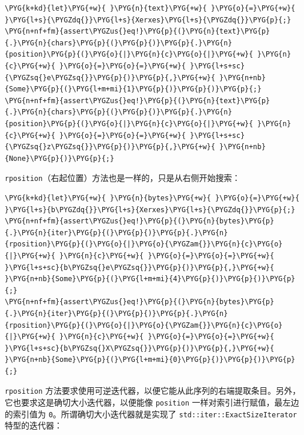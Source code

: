 \begin{Verbatim}[commandchars=\\\{\},breaklines=true,breakanywhere=true,fontsize=\codefont,xleftmargin=17bp]
\PYG{k+kd}{let}\PYG{+w}{ }\PYG{n}{text}\PYG{+w}{ }\PYG{o}{=}\PYG{+w}{ }\PYG{l+s}{\PYGZdq{}}\PYG{l+s}{Xerxes}\PYG{l+s}{\PYGZdq{}}\PYG{p}{;}
\PYG{n+nf+fm}{assert\PYGZus{}eq!}\PYG{p}{(}\PYG{n}{text}\PYG{p}{.}\PYG{n}{chars}\PYG{p}{(}\PYG{p}{)}\PYG{p}{.}\PYG{n}{position}\PYG{p}{(}\PYG{o}{|}\PYG{n}{c}\PYG{o}{|}\PYG{+w}{ }\PYG{n}{c}\PYG{+w}{ }\PYG{o}{=}\PYG{o}{=}\PYG{+w}{ }\PYG{l+s+sc}{\PYGZsq{}e\PYGZsq{}}\PYG{p}{)}\PYG{p}{,}\PYG{+w}{ }\PYG{n+nb}{Some}\PYG{p}{(}\PYG{l+m+mi}{1}\PYG{p}{)}\PYG{p}{)}\PYG{p}{;}
\PYG{n+nf+fm}{assert\PYGZus{}eq!}\PYG{p}{(}\PYG{n}{text}\PYG{p}{.}\PYG{n}{chars}\PYG{p}{(}\PYG{p}{)}\PYG{p}{.}\PYG{n}{position}\PYG{p}{(}\PYG{o}{|}\PYG{n}{c}\PYG{o}{|}\PYG{+w}{ }\PYG{n}{c}\PYG{+w}{ }\PYG{o}{=}\PYG{o}{=}\PYG{+w}{ }\PYG{l+s+sc}{\PYGZsq{}z\PYGZsq{}}\PYG{p}{)}\PYG{p}{,}\PYG{+w}{ }\PYG{n+nb}{None}\PYG{p}{)}\PYG{p}{;}
\end{Verbatim}

\texttt{rposition}（右起位置）方法也是一样的，只是从右侧开始搜索：

\begin{Verbatim}[commandchars=\\\{\},breaklines=true,breakanywhere=true,fontsize=\codefont,xleftmargin=17bp]
\PYG{k+kd}{let}\PYG{+w}{ }\PYG{n}{bytes}\PYG{+w}{ }\PYG{o}{=}\PYG{+w}{ }\PYG{l+s}{b\PYGZdq{}}\PYG{l+s}{Xerxes}\PYG{l+s}{\PYGZdq{}}\PYG{p}{;}
\PYG{n+nf+fm}{assert\PYGZus{}eq!}\PYG{p}{(}\PYG{n}{bytes}\PYG{p}{.}\PYG{n}{iter}\PYG{p}{(}\PYG{p}{)}\PYG{p}{.}\PYG{n}{rposition}\PYG{p}{(}\PYG{o}{|}\PYG{o}{\PYGZam{}}\PYG{n}{c}\PYG{o}{|}\PYG{+w}{ }\PYG{n}{c}\PYG{+w}{ }\PYG{o}{=}\PYG{o}{=}\PYG{+w}{ }\PYG{l+s+sc}{b\PYGZsq{}e\PYGZsq{}}\PYG{p}{)}\PYG{p}{,}\PYG{+w}{ }\PYG{n+nb}{Some}\PYG{p}{(}\PYG{l+m+mi}{4}\PYG{p}{)}\PYG{p}{)}\PYG{p}{;}
\PYG{n+nf+fm}{assert\PYGZus{}eq!}\PYG{p}{(}\PYG{n}{bytes}\PYG{p}{.}\PYG{n}{iter}\PYG{p}{(}\PYG{p}{)}\PYG{p}{.}\PYG{n}{rposition}\PYG{p}{(}\PYG{o}{|}\PYG{o}{\PYGZam{}}\PYG{n}{c}\PYG{o}{|}\PYG{+w}{ }\PYG{n}{c}\PYG{+w}{ }\PYG{o}{=}\PYG{o}{=}\PYG{+w}{ }\PYG{l+s+sc}{b\PYGZsq{}X\PYGZsq{}}\PYG{p}{)}\PYG{p}{,}\PYG{+w}{ }\PYG{n+nb}{Some}\PYG{p}{(}\PYG{l+m+mi}{0}\PYG{p}{)}\PYG{p}{)}\PYG{p}{;}
\end{Verbatim}

\texttt{rposition} 方法要求使用可逆迭代器，以便它能从此序列的右端提取条目。另外，它也要求这是确切大小迭代器，以便能像 \texttt{position} 一样对索引进行赋值，最左边的索引值为 \texttt{0}。所谓确切大小迭代器就是实现了 \texttt{std::iter::ExactSizeIterator} 特型的迭代器：

